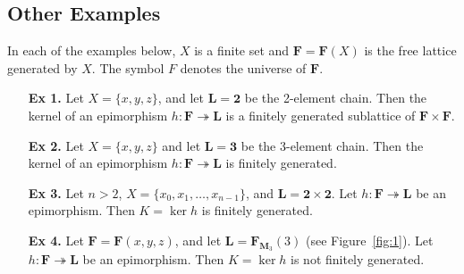\subsection{Other Examples}
In each of the examples below, $X$ is a finite set and 
$\mathbf{F} = \mathbf{F}(X)$ is the free lattice generated by $X$.
The symbol $F$ denotes the universe of $\mathbf{F}$. 
\begin{itemize}
\item[{\bf Ex 1.}] Let $X = \{x,y,z\}$, and let $\mathbf{L} = \mathbf{2}$ be the 2-element chain.    
Then the kernel of an epimorphism $h\colon \mathbf{F} \twoheadrightarrow \mathbf{L}$ is a finitely generated sublattice of $\mathbf{F} \times \mathbf{F}$.
\item[{\bf Ex 2.}] Let $X = \{x, y, z\}$ and let $\mathbf{L} = \mathbf{3}$ be the 3-element chain.    
Then the kernel of an epimorphism $h\colon \mathbf{F} \twoheadrightarrow \mathbf{L}$ is finitely generated.
\item[{\bf Ex 3.}] Let $n > 2$, $X = \{x_0, x_1,\dots, x_{n-1}\}$, and $\mathbf{L} = \mathbf{2} \times \mathbf{2}$.  
Let $h\colon \mathbf{F} \twoheadrightarrow \mathbf{L}$ be an epimorphism. Then $K = \operatorname{ker}h$ is finitely generated.  
\item[{\bf Ex 4.}] Let $\mathbf{F} = \mathbf{F}(x,y,z)$, and let $\mathbf{L} = \mathbf{F}_{\mathbf{M}_3}(3)$ (see Figure~\ref{fig:1}).  
Let $h\colon \mathbf{F} \twoheadrightarrow \mathbf{L}$ be an epimorphism. Then $K = \operatorname{ker}h$ is not finitely generated.  
\end{itemize}

